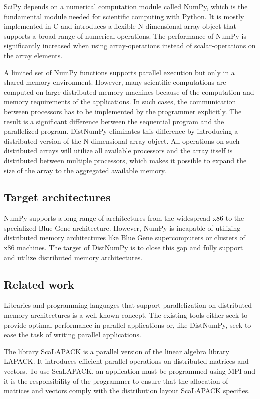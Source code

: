 \documentclass[10pt]{article}
\begin{document}
SciPy depends on a numerical computation module called NumPy\cite{numpy}, which is the fundamental module needed for scientific computing with Python. It is mostly implemented in C and introduces a flexible N-dimensional array object that supports a broad range of numerical operations. The performance of NumPy is significantly increased when using array-operations instead of scalar-operations on the array elements.

A limited set of NumPy functions supports parallel execution but only in a shared memory environment. However, many scientific computations are computed on large distributed memory machines because of the computation and memory requirements of the applications. In such cases, the communication between processors has to be implemented by the programmer explicitly. The result is a significant difference between the sequential program and the parallelized program. DistNumPy eliminates this difference by introducing a distributed version of the N-dimensional array object. All operations on such distributed arrays will utilize all available processors and the array itself is distributed between multiple processors, which makes it possible to expand the size of the array to the aggregated available memory.


\subsection{Target architectures}
NumPy supports a long range of architectures from the widespread x86 to the specialized Blue Gene architecture. However, NumPy is incapable of utilizing distributed memory architectures like Blue Gene supercomputers or clusters of x86 machines. The target of DistNumPy is to close this gap and fully support and utilize distributed memory architectures. 


\subsection{Related work}
Libraries and programming languages that support parallelization on distributed memory architectures is a well known concept. The existing tools either seek to provide optimal performance in parallel applications or, like DistNumPy, seek to ease the task of writing parallel applications.

The library ScaLAPACK\cite{Blackford96} is a parallel version of the linear algebra library LAPACK\cite{lapack90}. It introduces efficient parallel operations on distributed matrices and vectors. To use ScaLAPACK, an application must be programmed using MPI\cite{mpi} and it is the responsibility of the programmer to ensure that the allocation of matrices and vectors comply with the distribution layout ScaLAPACK specifies.
\end{document}
